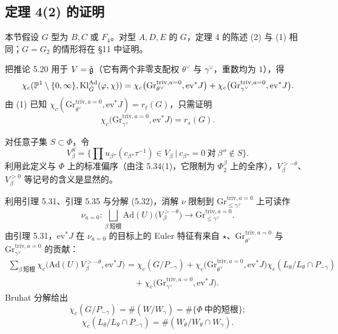 
\subsection{定理 4(2) 的证明}

本节假设 $G$ 型为 $B,C$ 或 $F_4$。对型 $A,D,E$ 的 $G$，定理 4 的陈述 (2) 与 (1) 相同；$G=G_2$ 的情形将在 §11 中证明。

把推论 5.20 用于 $V=\check{\mathfrak g}$（它有两个非零支配权 $\theta^\vee$ 与 $\gamma^\vee$，重数均为 $1$），得
\[
\chi_c(\mathbb{P}^1\setminus\{0,\infty\},\mathrm{Kl}^{\mathrm{Ad}}_{\check G}(\varphi,\chi))=\chi_c\big(\mathrm{Gr}^{\mathrm{triv},a=0}_{\theta^\vee},\mathrm{ev}^*J\big)+\chi_c\big(\mathrm{Gr}^{\mathrm{triv},a=0}_{\gamma^\vee},\mathrm{ev}^*J\big).
\]
由 (1) 已知 $\chi_c(\mathrm{Gr}^{\mathrm{triv},a=0}_{\theta^\vee},\mathrm{ev}^*J)=r_\ell(G)$，只需证明
\[
\chi_c\big(\mathrm{Gr}^{\mathrm{triv},a=0}_{\gamma^\vee},\mathrm{ev}^*J\big)=r_s(G).
\]

对任意子集 $S\subset\Phi$，令
\[
V^S_\beta=\Big\{\prod u_{\beta''}(c_{\beta''}\tau^{-1})\in V_\beta\ \Big|\ c_{\beta''}=0\ \text{对}\ \beta''\notin S\Big\}.
\]
利用此定义与 $\Phi$ 上的标准偏序（由注 5.34(1)，它限制为 $\Phi^\beta_2$ 上的全序），$V^{>-\theta}_\beta$、$V^{>0}_\beta$ 等记号的含义是显然的。

利用引理 5.31、引理 5.35 与分解 (5.32)，消解 $\nu$ 限制到 $\mathrm{Gr}^{\mathrm{triv},a=0}_{\le\gamma^\vee}$ 上可读作
\[
\nu_{a=0}:\bigsqcup_{\beta\ \text{短根}}\mathrm{Ad}(U)\big(V^{>-\theta}_\beta\big)\to\mathrm{Gr}^{\mathrm{triv},a=0}_{\le\gamma^\vee}.
\]
由引理 5.31，$\mathrm{ev}^*J$ 在 $\nu_{a=0}$ 的目标上的 Euler 特征有来自 $\star$、$\mathrm{Gr}^{\mathrm{triv},a=0}_{\theta^\vee}$ 与 $\mathrm{Gr}^{\mathrm{triv},a=0}_{\gamma^\vee}$ 的贡献：
\begin{equation}
\begin{aligned}
\sum_{\beta\ \text{短根}}\chi_c\big(\mathrm{Ad}(U)V^{>-\theta}_\beta,\mathrm{ev}^*J\big)
&=\chi_c(G/P_{-\gamma})+\chi_c\big(\mathrm{Gr}^{\mathrm{triv},a=0}_{\theta^\vee},\mathrm{ev}^*J\big)\chi_c(L_\theta/L_\theta\cap P_{-\gamma})\\
&\quad+\chi_c\big(\mathrm{Gr}^{\mathrm{triv},a=0}_{\gamma^\vee},\mathrm{ev}^*J\big).
\end{aligned}
\end{equation}
Bruhat 分解给出
\begin{equation}
\chi_c(G/P_{-\gamma})=\#(W/W_\gamma)=\#\{\Phi\ \text{中的短根}\};
\end{equation}
\begin{equation}
\chi_c(L_\theta/L_\theta\cap P_{-\gamma})=\#(W_\theta/W_\theta\cap W_\gamma).
\end{equation}

